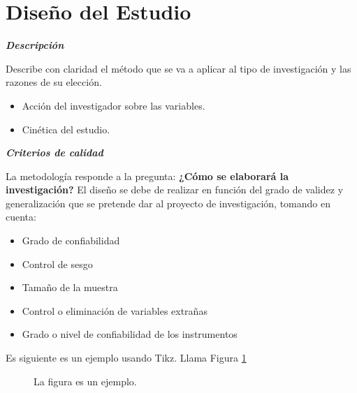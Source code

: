 
\section{Diseño del Estudio}
    
    \textbf{\textit{Descripción}}
    
    Describe con claridad el método que se va a aplicar al tipo de investigación y las razones de su elección.
    \begin{itemize}
        \item Acción del investigador sobre las variables.
        \item Cinética del estudio.
    \end{itemize}
    
    \textbf{\textit{Criterios de calidad}}
    
    La metodología responde a la pregunta: \textbf{¿Cómo se elaborará la investigación?}
    El diseño se debe de realizar en función del grado de validez y generalización que se pretende dar al proyecto de investigación, tomando en cuenta:
    
    \begin{itemize}
        \item Grado de confiabilidad
        \item Control de sesgo
        \item Tamaño de la muestra
        \item Control o eliminación de variables extrañas
        \item Grado o nivel de confiabilidad de los instrumentos
    \end{itemize}
    
    Es siguiente es un ejemplo usando Tikz. Llama Figura \ref{fig:ArregloFuentes}
    
    \begin{figure}
        \centering
        \caption{La figura es un ejemplo.}
        \label{fig:ArregloFuentes}
    \end{figure}


